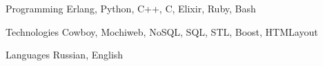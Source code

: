 

\begin{cvskills}

  \cvskill
    {Programming} %
    {Erlang, Python, C++, C, Elixir, Ruby, Bash} %

  \cvskill
    {Technologies} %
    {Cowboy, Mochiweb, NoSQL, SQL, STL, Boost, HTMLayout} %

  \cvskill
    {Languages} %
    {Russian, English} %

\end{cvskills}
